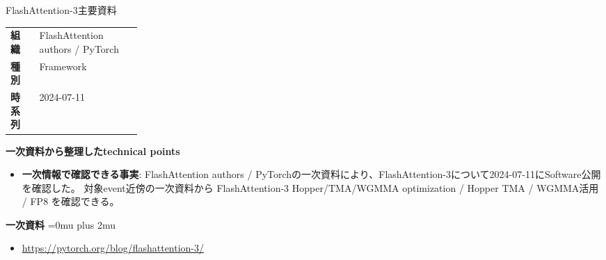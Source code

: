 \begin{technicalnote}{FlashAttention-3}{主要資料}
\begingroup
\begin{tabularx}{\linewidth}{@{}>{\bfseries}p{0.22\linewidth}X@{}}
組織 & FlashAttention authors / PyTorch \\
種別 & Framework \\
時系列 & 2024-07-11 \\
\end{tabularx}
\smallskip
{\bfseries 一次資料から整理したtechnical points}
\begin{itemize}[leftmargin=1.5em,itemsep=0.35em]
\item \textbf{一次情報で確認できる事実}: FlashAttention authors / PyTorchの一次資料により、FlashAttention-3について2024-07-11にSoftware公開を確認した。 対象event近傍の一次資料から FlashAttention-3 Hopper/TMA/WGMMA optimization / Hopper TMA / WGMMA活用 / FP8 を確認できる。
\end{itemize}
\begin{minipage}{\linewidth}
\begin{samepage}
{\bfseries 一次資料}
\begingroup\sloppy
\Urlmuskip=0mu plus 2mu\relax
\begin{itemize}[leftmargin=1.5em,itemsep=0.25em]
\item {\scriptsize\url{https://pytorch.org/blog/flashattention-3/}}
\end{itemize}
\endgroup
\end{samepage}
\end{minipage}
\endgroup
\end{technicalnote}
\medskip

